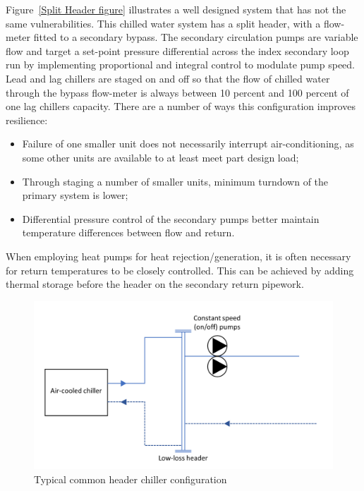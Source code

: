 \documentclass[11pt, oneside]{article}   	%
\begin{document}
Figure~\ref{Split Header figure} illustrates a well designed system that has not the same vulnerabilities.
This chilled water system has a split header, with a flow-meter fitted to a secondary bypass.
The secondary circulation pumps are variable flow and target a set-point pressure differential across the index secondary loop run by implementing proportional and integral control to modulate pump speed.
Lead and lag chillers are staged on and off so that the flow of chilled water through the bypass flow-meter is always between 10 percent and 100 percent of one lag chillers capacity.
There are a number of ways this configuration improves resilience:
\begin{itemize}
	\item Failure of one smaller unit does not necessarily interrupt air-conditioning, as some other units are available to at least meet part design load; 
	\item Through staging a number of smaller units, minimum turndown of the primary system is lower;
	\item Differential pressure control of the secondary pumps better maintain temperature differences between flow and return.
\end{itemize}
When employing heat pumps for heat rejection/generation, it is often necessary for return temperatures to be closely controlled.
This can be achieved by adding thermal storage before the header on the secondary return pipework.\

\pagebreak

\FloatBarrier
\begin{figure}
\begin{center}
\includegraphics[width=1\textwidth]{commonHeader.PNG}
\caption{Typical common header chiller configuration}
\label{Common Header figure}
\end{center}
\end{figure}
\FloatBarrier
\end{document}
